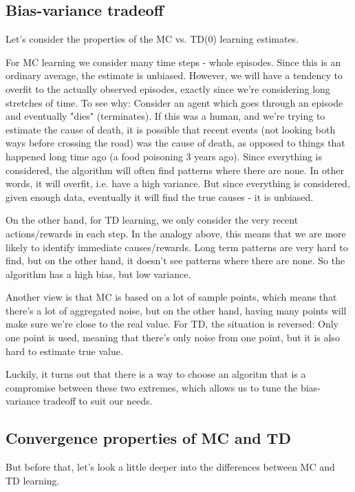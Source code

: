 \documentclass[12pt, a4paper]{article}
\numberwithin{equation}{section}
\begin{document}
\subsection{Bias-variance tradeoff}
Let's consider the properties of the MC vs. TD(0) learning estimates.

For MC learning we consider many time steps - whole episodes. Since this is an ordinary average, the estimate is unbiased. However, we will have a tendency to overfit to the actually observed episodes, exactly since we're considering long stretches of time. To see why: Consider an agent which goes through an episode and eventually "dies" (terminates). If this was a human, and we're trying to estimate the cause of death, it is possible that recent events (not looking both ways before crossing the road) was the cause of death, as opposed to things that happened long time ago (a food poisoning 3 years ago). Since everything is considered, the algorithm will often find patterns where there are none. In other words, it will overfit, i.e. have a high variance. But since everything is considered, given enough data, eventually it will find the true causes - it is unbiased.

On the other hand, for TD learning, we only consider the very recent actions/rewards in each step. In the analogy above, this means that we are more likely to identify immediate causes/rewards. Long term patterns are very hard to find, but on the other hand, it doesn't see patterns where there are none. So the algorithm has a high bias, but low variance.

Another view is that MC is based on a lot of sample points, which means that there's a lot of aggregated noise, but on the other hand, having many points will make sure we're close to the real value. For TD, the situation is reversed: Only one point is used, meaning that there's only noise from one point, but it is also hard to estimate true value.

Luckily, it turns out that there is a way to choose an algoritm that is a compromise between these two extremes, which allows us to tune the bias-variance tradeoff to suit our needs.

\subsection{Convergence properties of MC and TD}
But before that, let's look a little deeper into the differences between MC and TD learning. 
\end{document}
